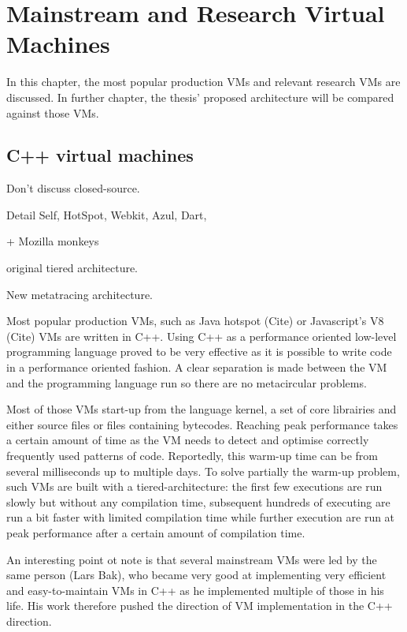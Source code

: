 \documentclass[a4paper,12pt,twoside]{../includes/ThesisStyle}
\begin{document}
\fi

\chapter{Mainstream and Research Virtual Machines}
\label{chap:stateOfTheArt}
\minitoc

In this chapter, the most popular production VMs and relevant research VMs are discussed. In further chapter, the thesis' proposed architecture will be compared against those VMs. 

\section{C++ virtual machines}

Don't discuss closed-source.

Detail Self, HotSpot, Webkit, Azul, Dart, 

+ Mozilla monkeys

original tiered architecture.

New metatracing architecture.



Most popular production VMs, such as Java hotspot (Cite) or Javascript's V8 (Cite) VMs are written in C++. Using C++ as a performance oriented low-level programming language proved to be very effective as it is possible to write code in a performance oriented fashion. A clear separation is made between the VM and the programming language run so there are no metacircular problems.

Most of those VMs start-up from the language kernel, a set of core librairies and either source files or files containing bytecodes. Reaching peak performance takes a certain amount of time as the VM needs to detect and optimise correctly frequently used patterns of code. Reportedly, this warm-up time can be from several milliseconds up to multiple days. To solve partially the warm-up problem, such VMs are built with a tiered-architecture: the first few executions are run slowly but without any compilation time, subsequent hundreds of executing are run a bit faster with limited compilation time while further execution are run at peak performance after a certain amount of compilation time.

An interesting point ot note is that several mainstream VMs were led by the same person (Lars Bak), who became very good at implementing very efficient and easy-to-maintain VMs in C++ as he implemented multiple of those in his life. His work therefore pushed the direction of VM implementation in the C++ direction.
\end{document}
